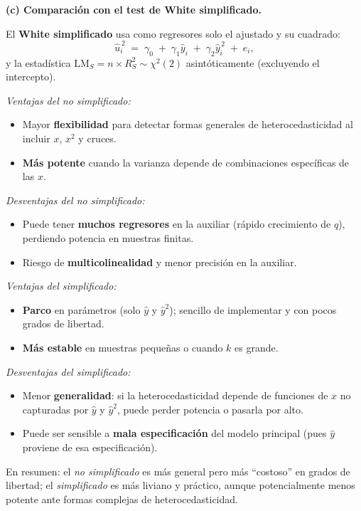 \documentclass[10pt,a4paper]{article}
\begin{document}
\begin{enumerate}
\begin{enumerate}
\medskip
\textbf{(c) Comparación con el test de White simplificado.}

El \textbf{White simplificado} usa como regresores solo el ajustado y su cuadrado:
\[
\hat u_i^{\,2} \;=\; \gamma_0 \;+\; \gamma_1 \hat y_i \;+\; \gamma_2 \hat y_i^{\,2} \;+\; e_i,
\]
y la estadística \(\text{LM}_S = n\times R_S^2 \sim \chi^2(2)\) asintóticamente (excluyendo el intercepto).

\emph{Ventajas del no simplificado:}
\begin{itemize}
  \item Mayor \textbf{flexibilidad} para detectar formas generales de heterocedasticidad al incluir \(x\), \(x^2\) y cruces.
  \item \textbf{Más potente} cuando la varianza depende de combinaciones específicas de las \(x\).
\end{itemize}

\emph{Desventajas del no simplificado:}
\begin{itemize}
  \item Puede tener \textbf{muchos regresores} en la auxiliar (rápido crecimiento de \(q\)), perdiendo potencia en muestras finitas.
  \item Riesgo de \textbf{multicolinealidad} y menor precisión en la auxiliar.
\end{itemize}

\emph{Ventajas del simplificado:}
\begin{itemize}
  \item \textbf{Parco} en parámetros (solo \(\hat y\) y \(\hat y^2\)); sencillo de implementar y con pocos grados de libertad.
  \item \textbf{Más estable} en muestras pequeñas o cuando \(k\) es grande.
\end{itemize}

\emph{Desventajas del simplificado:}
\begin{itemize}
  \item Menor \textbf{generalidad}: si la heterocedasticidad depende de funciones de \(x\) no capturadas por \(\hat y\) y \(\hat y^2\), puede perder potencia o pasarla por alto.
  \item Puede ser sensible a \textbf{mala especificación} del modelo principal (pues \(\hat y\) proviene de esa especificación).
\end{itemize}

\noindent En resumen: el \emph{no simplificado} es más general pero más “costoso” en grados de libertad; el \emph{simplificado} es más liviano y práctico, aunque potencialmente menos potente ante formas complejas de heterocedasticidad.


\end{enumerate}
\end{enumerate}
\end{document}
